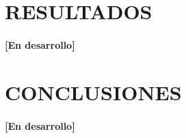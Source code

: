 \documentclass[10pt, twocolumn]{article}
\begin{document}
\section{RESULTADOS}
\paragraph{[En desarrollo]}

\section{CONCLUSIONES}
\paragraph{[En desarrollo]}



\end{document}

